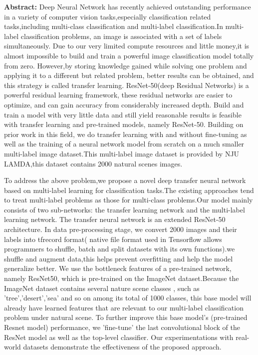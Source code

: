 {\renewcommand\baselinestretch{1}\selectfont
\noindent\textbf{Abstract: }
Deep Neural Network has recently achieved outstanding performance in a variety of computer 
vision tasks,especially classification related tasks,including multi-class classification 
 and multi-label classification.In multi-label classification problems, an image is associated 
 with a set of labels simultaneously.
Due to our very limited compute resources and little money,it is almost impossible to 
build and train a powerful image classification model totally from zero.
However,by storing knowledge gained while solving one problem and applying it to a different
but related problem, better results can be obtained, and this strategy is called transfer learning. 
ResNet-50(deep Residual Networks) is a powerful residual learning framework,
these residual networks are easier to optimize, and can gain accuracy from 
considerably increased depth. Build and train a model with very little data 
and still yield reasonable results is feasible with transfer learning and pre-trained
models, namely ResNet-50.
Building on prior work in this field, we do transfer learning with and without fine-tuning 
as well as the training of a neural network model from scratch on a much smaller 
multi-label image dataset.This multi-label image dataset is provided by NJU LAMDA,this dataset 
contains 2000 natural scenes images.

To address the above problem,we propose a novel deep transfer neural network based on 
multi-label learning for classification tasks.The existing approaches tend to treat multi-label problems as those for multi-class 
problems.Our model mainly consists of two sub-networks: the transfer learning network and the multi-label learning network.
The transfer neural network is an extended ResNet-50 architecture.
In data pre-processing stage, we convert 2000 images and their labels into tfrecord format(
native file format used in Tensorflow allows programmers to shuffle, batch and split datasets with its 
own functions).we shuffle and augment data,this helps prevent overfitting and help the 
model generalize better. We use the bottleneck features of a pre-trained network, namely ResNet50, 
which is pre-trained on the ImageNet dataset.Because the ImageNet dataset contains several nature scene classes
, such as 'tree','desert','sea' and so on among its total of 1000 classes, this base model will
already have learned features that are relevant to our multi-label classification problem under 
natural scene. To further improve this base model's (pre-trained Resnet model) performance,
we 'fine-tune' the last convolutional block of the ResNet model as well as the top-level classifier.
Our experimentations with real-world datasets demonstrate the effectiveness of the proposed approach.

}
